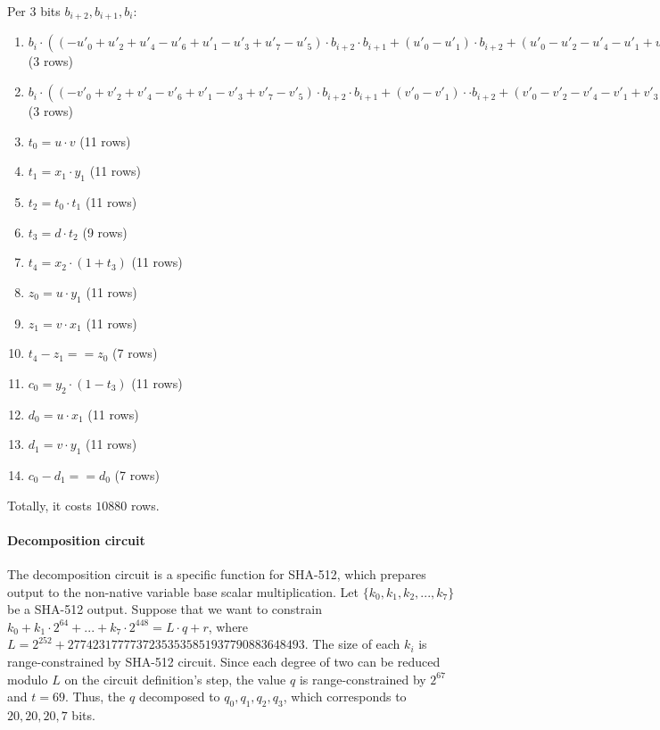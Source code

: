 Per $3$ bits $b_{i + 2}, b_{i + 1}, b_i$:
\begin{enumerate}
\item $b_i \cdot ((-u'_0 + u'_2 + u'_4 - u'_6 + u'_1 - u'_3 + u'_7 - u'_5) \cdot b_{i + 2} \cdot b_{i + 1} + (u'_0 - u'_1) \cdot b_{i + 2} + (u'_0 - u'_2 - u'_4 - u'_1 + u'_3 + u'_5) \cdot b_{i + 1} - u'_0 + u'_1 ) - (u - (u'_0 + u'_2 + u'_4 -u'_6) \cdot b_{i + 1} \cdot b_{i + 2} + u'_0 \cdot b_{i + 2} + (u'_0 - u'_2 - u'_4) \cdot b_{i + 1}- u'_0)$ (3 rows)
\item $b_i \cdot ((-v'_0 + v'_2 + v'_4 - v'_6 + v'_1 - v'_3 + v'_7 - v'_5) \cdot b_{i + 2} \cdot b_{i + 1} + (v'_0 - v'_1) \cdot \cdot b_{i + 2} + (v'_0 - v'_2 - v'_4 - v'_1 + v'_3 + v'_5) \cdot \cdot b_{i + 1} - v'_0 + v'_1 ) - (v - (v'_0 + v'_2 + v'_4 - v'_6) \cdot b_{i + 1} \cdot b_{i + 2} + v'_0 \cdot b_{i + 2} + (v'_0 - v'_2 - v'_4) \cdot b_{i + 1} - v'_0)$ (3 rows)
\item $t_0 = u \cdot v$ (11 rows)
\item $t_1 =  x_1 \cdot y_1$ (11 rows)
\item $t_2 = t_0 \cdot t_1$ (11 rows)
\item $t_3 = d \cdot t_2$ (9 rows)
\item $t_4 = x_2 \cdot (1 + t_3)$ (11 rows)
\item $z_0 = u \cdot y_1$ (11 rows)
\item $z_1 = v \cdot x_1$ (11 rows)
\item $t_4 - z_1 == z_0$ (7 rows)
\item $c_0 = y_2 \cdot (1 - t_3)$ (11 rows)
\item $d_0 = u \cdot x_1$ (11 rows)
\item $d_1 = v \cdot y_1$ (11 rows)
\item $c_0 - d_1 == d_0$ (7 rows)
\end{enumerate}
Totally, it costs $10 880$ rows.

\paragraph{Decomposition circuit}
The decomposition circuit is a specific function for SHA-512, which prepares output to the non-native variable base scalar multiplication.
Let $\{ k_0, k_1, k_2, ..., k_7\}$ be a SHA-512 output.
Suppose that we want to constrain $k_0 + k_1 \cdot 2^{64} + ...+ k_7 \cdot 2^{448} = L \cdot q + r$, where $L = 2^{252}+27742317777372353535851937790883648493$.
The size of each $k_i$ is range-constrained by SHA-512 circuit.
Since each degree of two can be reduced modulo $L$ on the circuit definition's step, the value $q$ is range-constrained by $2^67$ and $t = 69$.
Thus, the $q$ decomposed to $q_0, q_1, q_2, q_3$, which corresponds to $20, 20, 20, 7$ bits.
